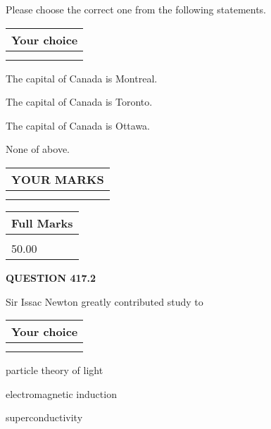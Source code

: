 \documentclass[12pt]{article}
\begin{document}
  
Please choose the correct one from the following statements.
  
  
\noindent\hspace{3.0in} \begin{tabular}{|l|}
\hline
Your choice \\
\hline
 \\ 
 \\ 
\hline
\end{tabular}
  
  
 
 
The capital of Canada is Montreal.
 
 
The capital of Canada is Toronto.
 
 
The capital of Canada is Ottawa.
 
 
 None of above.
 
 
  
\vspace{0.2in}
  
\noindent\begin{tabular}{|l|}
\hline
 YOUR MARKS  \\
\hline
 \\ 
 \\ 
\hline
\end{tabular}
\hspace{0.05in} \begin{tabular}{|l|}
\hline
 Full Marks  \\
\hline
 \\ 
50.00 \\
\hline
\end{tabular}
{\textbf{\Large{QUESTION
417.2 
}}}
  
  
Sir Issac Newton greatly contributed study to
  
  
\noindent\hspace{3.0in} \begin{tabular}{|l|}
\hline
Your choice \\
\hline
 \\ 
 \\ 
\hline
\end{tabular}
  
  
 
 
particle theory of light
 
 
electromagnetic induction
 
 
superconductivity
 
\end{document}
